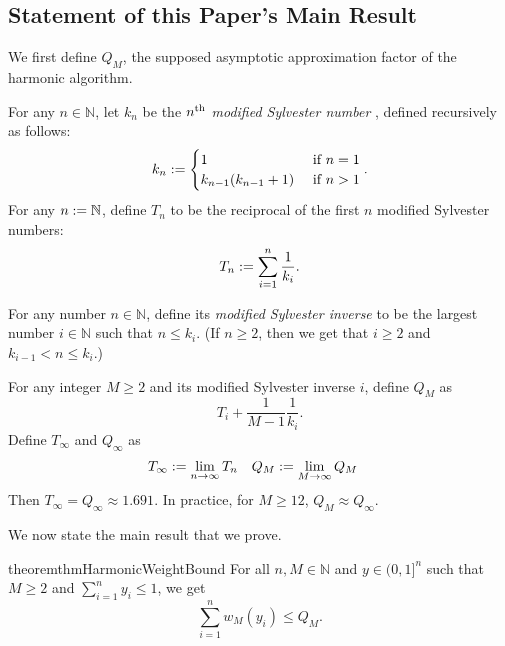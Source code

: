 \subsection{Statement of this Paper's Main Result}

We first define $Q_M$, the supposed asymptotic approximation factor of the harmonic algorithm.

For any $n \in \mathbb{N}$, let $k_n$ be the $n^{\textrm{th}}$ \emph{modified Sylvester number} \cite{oeisA007018},
defined recursively as follows:
\[ k_n := \begin{cases}
    1 & \text{ if } n = 1
    \\ k_{n-1}(k_{n-1}+1) & \text{ if } n > 1
\end{cases}. \]
For any $n := \mathbb{N}$, define $T_n$ to be the reciprocal of the first $n$ modified Sylvester numbers:
\[ T_n := \sum_{i=1}^n \frac{1}{k_i}. \]

For any number $n \in \mathbb{N}$, define its \emph{modified Sylvester inverse} to be the
largest number $i \in \mathbb{N}$ such that $n \le k_i$.
(If $n \ge 2$, then we get that $i \ge 2$ and $k_{i-1} < n \le k_i$.)

For any integer $M \ge 2$ and its modified Sylvester inverse $i$, define $Q_M$ as
\[ T_i + \frac{1}{M-1}\frac{1}{k_i}. \]
Define $T_{\infty}$ and $Q_{\infty}$ as
\begin{align*}
T_{\infty} &:= \lim_{n \to \infty} T_n
& Q_M &:= \lim_{M \to \infty} Q_M
\end{align*}
Then $T_{\infty} = Q_{\infty} \approx 1.691$.
In practice, for $M \ge 12$, $Q_M \approx Q_{\infty}$.

We now state the main result that we prove.

\begin{restatable}{theorem}{thmHarmonicWeightBound}
\label{thm:harmonic-bound}
For all $n, M \in \mathbb{N}$ and $y \in (0, 1]^n$ such that
$M \ge 2$ and $\sum_{i=1}^n y_i \le 1$, we get
\[ \sum_{i=1}^n w_M(y_i) \le Q_M. \]
\end{restatable}
